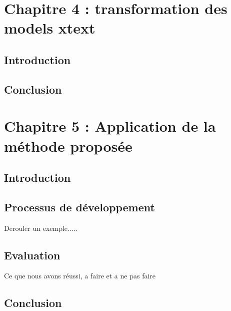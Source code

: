 \documentclass[
10pt, %
a4paper, %
oneside, %
headinclude,footinclude, %
BCOR5mm, %
]{report}
\begin{document}
										  
		\newpage 
		\chapter{Chapitre 4 : transformation des models xtext}
		\minitoc  
		\section{Introduction}
		\lipsum[10] %
		\section{Conclusion}
		\lipsum[10]
										  
										  
										  
		\newpage
		\chapter{Chapitre 5 : Application de la méthode proposée  }
		\minitoc  
		\section{Introduction}
		\lipsum[10]
		\section{Processus de développement}
		Derouler un exemple.....
		\section{Evaluation}
		Ce que nous avons réussi, a faire et a ne pas faire
		\section{Conclusion}
		\lipsum[10]	
										  
\end{document}
